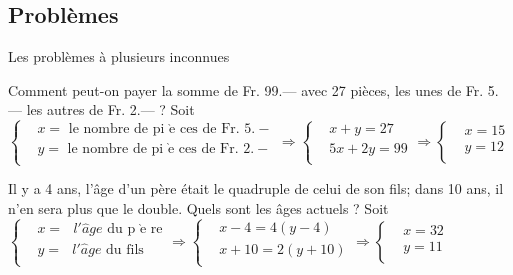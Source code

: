 \subsection{Problèmes}

Les problèmes à plusieurs inconnues

\begin{solution}
Comment peut-on payer la somme de Fr. 99.— avec 27 pièces, les unes de Fr. 5.— les autres de Fr. 2.— ?
Soit $\left\{ \begin{array}{ll}
  & x=\text{ le nombre de pi }\!\!\grave{\mathrm{e}}\!\!\text{ ces de Fr}\text{. 5}\text{.}- \\ 
 & y=\text{ le nombre de pi }\!\!\grave{\mathrm{e}}\!\!\text{ ces de Fr}\text{. 2}\text{.}- \\ 
\end{array} \right.\Rightarrow \left\{ \begin{array}{ll}
  & x+y=27 \\ 
 & 5x+2y=99 \\ 
\end{array} \right.\Rightarrow \left\{ \begin{array}{ll}
  & x=15 \\ 
 & y=12 \\ 
\end{array} \right.$
\end{solution}

\begin{solution}
Il y a 4 ans, l’âge d’un père était le quadruple de celui de son fils; dans 10 ans, il n’en sera plus que le double. Quels sont les âges actuels ?
Soit $\left\{ \begin{array}{ll}
  & x=\text{ }l'\hat{a}ge\text{ du p }\!\!\grave{\mathrm{e}}\!\!\text{ re} \\ 
 & y=\text{ }l'\hat{a}ge\text{ du fils} \\ 
\end{array} \right.\Rightarrow \left\{ \begin{array}{ll}
  & x-4=4\left( y-4 \right) \\ 
 & x+10=2\left( y+10 \right) \\ 
\end{array} \right.\Rightarrow \left\{ \begin{array}{ll}
  & x=32 \\ 
 & y=11 \\ 
\end{array} \right.$
\end{solution}

